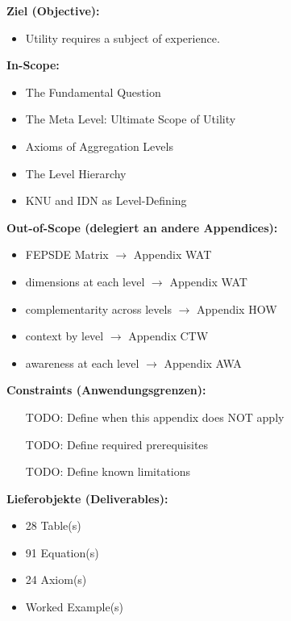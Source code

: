 \begin{tcolorbox}[
    colback=orange!5!white,
    colframe=orange!75!black,
    title={\textbf{Appendix Scope: Ziel / In-Scope / Out-of-Scope / Constraints}},
    fonttitle=\bfseries
]

\textbf{Ziel (Objective):}
\begin{itemize}[nosep]
    \item Utility requires a subject of experience.
\end{itemize}

\textbf{In-Scope:}
\begin{itemize}[nosep]
    \item The Fundamental Question
    \item The Meta Level: Ultimate Scope of Utility
    \item Axioms of Aggregation Levels
    \item The Level Hierarchy
    \item KNU and IDN as Level-Defining
\end{itemize}

\textbf{Out-of-Scope (delegiert an andere Appendices):}
\begin{itemize}[nosep]
    \item FEPSDE Matrix $\rightarrow$ Appendix WAT
    \item dimensions at each level $\rightarrow$ Appendix WAT
    \item complementarity across levels $\rightarrow$ Appendix HOW
    \item context by level $\rightarrow$ Appendix CTW
    \item awareness at each level $\rightarrow$ Appendix AWA
\end{itemize}

\textbf{Constraints (Anwendungsgrenzen):}
\begin{itemize}[nosep]
    \item [TODO: Define when this appendix does NOT apply]
    \item [TODO: Define required prerequisites]
    \item [TODO: Define known limitations]
\end{itemize}

\textbf{Lieferobjekte (Deliverables):}
\begin{itemize}[nosep]
    \item 28 Table(s)
    \item 91 Equation(s)
    \item 24 Axiom(s)
    \item Worked Example(s)
\end{itemize}

\end{tcolorbox}


